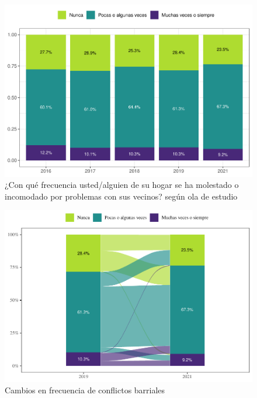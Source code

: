 \documentclass[
  12pt,
  openany]{book}
\begin{document}
\begin{figure}

{\centering \includegraphics{reporte-elsoc_files/figure-latex/confli-olas-1} 

}

\caption{¿Con qué frecuencia usted/alguien de su hogar se ha molestado o incomodado por problemas con sus vecinos? según ola de estudio }\label{fig:confli-olas}
\end{figure}

\begin{figure}

{\centering \includegraphics{reporte-elsoc_files/figure-latex/confli-cambio-1} 

}

\caption{Cambios en frecuencia de conflictos barriales}\label{fig:confli-cambio}
\end{figure}
\end{document}
